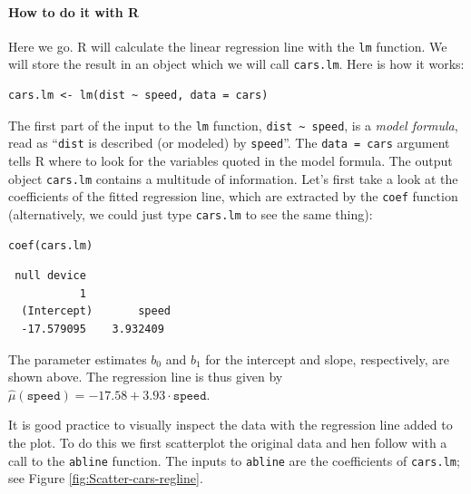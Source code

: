 \documentclass[captions=tableheading]{scrbook}
\begin{document}
\paragraph*{How to do it with \textsf{R}}



Here we go. \textsf{R} will calculate the linear regression line with the \texttt{lm} function. We will store the result in an object which we will call \texttt{cars.lm}. Here is how it works:


\begin{verbatim}
cars.lm <- lm(dist ~ speed, data = cars)
\end{verbatim}

The first part of the input to the \texttt{lm} function, \texttt{dist \textasciitilde{} speed}, is a \emph{model formula}, read as ``\texttt{dist} is described (or modeled) by \texttt{speed}''. The \texttt{data = cars} argument tells \textsf{R} where to look for the variables quoted in the model formula. The output object \texttt{cars.lm} contains a multitude of information. Let's first take a look at the coefficients of the fitted regression line, which are extracted by the \texttt{coef} function (alternatively, we could just type \texttt{cars.lm} to see the same thing):


\begin{verbatim}
coef(cars.lm)
\end{verbatim}

\begin{verbatim}
 null device 
           1
  (Intercept)       speed 
  -17.579095    3.932409
\end{verbatim}

The parameter estimates \( b_{0} \) and \( b_{1} \) for the intercept and slope, respectively, are shown above. The regression line is thus given by \( \hat{\mu}(\mathtt{speed}) =  -17.58 +  3.93 \cdot \mathtt{speed} \).

It is good practice to visually inspect the data with the regression line added to the plot. To do this we first scatterplot the original data and hen follow with a call to the \texttt{abline} function. The inputs to \texttt{abline} are the coefficients of \texttt{cars.lm}; see Figure \ref{fig:Scatter-cars-regline}.
\end{document}
